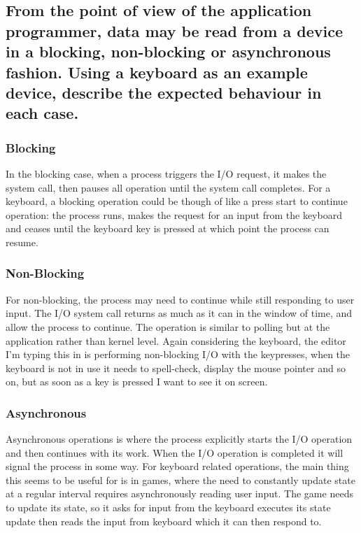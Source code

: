 \documentclass[]{article}
\begin{document}
    \subsection{From the point of view of the application programmer, data may be read from a device in a blocking, non-blocking or asynchronous fashion. Using a keyboard as an example device, describe the expected behaviour in each case.}

        \subsubsection{Blocking}

            In the blocking case, when a process triggers the I/O request, it makes the system call, then pauses all operation until the system call completes. For a keyboard, a blocking operation could be though of like a press start to continue operation: the process runs, makes the request for an input from the keyboard and ceases until the keyboard key is pressed at which point the process can resume.

        \subsubsection{Non-Blocking}

            For non-blocking, the process may need to continue while still responding to user input. The I/O system call returns as much as it can in the window of time, and allow the process to continue. The operation is similar to polling but at the application rather than kernel level. Again considering the keyboard, the editor I'm typing this in is performing non-blocking I/O with the keypresses, when the keyboard is not in use it needs to spell-check, display the mouse pointer and so on, but as soon as a key is pressed I want to see it on screen.

        \subsubsection{Asynchronous}

            Asynchronous operations is where the process explicitly starts the I/O operation and then continues with its work. When the I/O operation is completed it will signal the process in some way. For keyboard related operations, the main thing this seems to be useful for is in games, where the need to constantly update state at a regular interval requires asynchronously reading user input. The game needs to update its state, so it asks for input from the keyboard executes its state update then reads the input from keyboard which it can then respond to.
\end{document}
